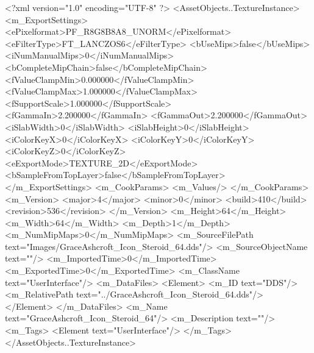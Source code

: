 <?xml version="1.0" encoding="UTF-8" ?>
<AssetObjects..TextureInstance>
	<m_ExportSettings>
		<ePixelformat>PF_R8G8B8A8_UNORM</ePixelformat>
		<eFilterType>FT_LANCZOS6</eFilterType>
		<bUseMips>false</bUseMips>
		<iNumManualMips>0</iNumManualMips>
		<bCompleteMipChain>false</bCompleteMipChain>
		<fValueClampMin>0.000000</fValueClampMin>
		<fValueClampMax>1.000000</fValueClampMax>
		<fSupportScale>1.000000</fSupportScale>
		<fGammaIn>2.200000</fGammaIn>
		<fGammaOut>2.200000</fGammaOut>
		<iSlabWidth>0</iSlabWidth>
		<iSlabHeight>0</iSlabHeight>
		<iColorKeyX>0</iColorKeyX>
		<iColorKeyY>0</iColorKeyY>
		<iColorKeyZ>0</iColorKeyZ>
		<eExportMode>TEXTURE_2D</eExportMode>
		<bSampleFromTopLayer>false</bSampleFromTopLayer>
	</m_ExportSettings>
	<m_CookParams>
		<m_Values/>
	</m_CookParams>
	<m_Version>
		<major>4</major>
		<minor>0</minor>
		<build>410</build>
		<revision>536</revision>
	</m_Version>
	<m_Height>64</m_Height>
	<m_Width>64</m_Width>
	<m_Depth>1</m_Depth>
	<m_NumMipMaps>0</m_NumMipMaps>
	<m_SourceFilePath text="Images/GraceAshcroft_Icon_Steroid_64.dds"/>
	<m_SourceObjectName text=""/>
	<m_ImportedTime>0</m_ImportedTime>
	<m_ExportedTime>0</m_ExportedTime>
	<m_ClassName text="UserInterface"/>
	<m_DataFiles>
		<Element>
			<m_ID text="DDS"/>
			<m_RelativePath text="../GraceAshcroft_Icon_Steroid_64.dds"/>
		</Element>
	</m_DataFiles>
	<m_Name text="GraceAshcroft_Icon_Steroid_64"/>
	<m_Description text=""/>
	<m_Tags>
		<Element text="UserInterface"/>
	</m_Tags>
</AssetObjects..TextureInstance>
